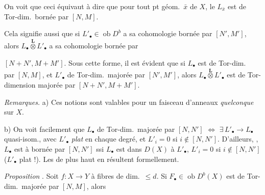 \documentclass[11pt,a4paper]{article}
\begin{document}
On voit que ceci équivaut à dire que pour tout pt géom.\ $\bar{x}$ de $X$,
le  $L_{\bar{x}}$ est de Tor-dim.\ bornée par
$[N, M]$.

\struck{\ill{}}

Cela signifie aussi que si $L'_\bullet \in \operatorname{ob} D^b$ a sa
\struck{\ill{}} cohomologie bornée par $[N', M']$, alors
$L_\bullet \overset{\mathbf{L}}{\otimes} L'_\bullet$ a sa cohomologie bornée
par

\struck{\ill{}} $[N + N', M + M']$. Sous cette forme, il est évident que si
$L_\bullet$ est de Tor-dim.\  par $[N, M]$, et
$L'_\bullet$ de Tor-dim.\ majorée par $[N', M']$, alors
$L_\bullet \overset{\mathbf{L}}{\otimes} L'_\bullet$ est de Tor-dimension
majorée par $[N + N', M + M']$.

\textit{Remarques.} a) Ces notions sont valables pour un faisceau
d'anneaux \textit{quelconque} sur $X$.

b) On voit facilement que $L_\bullet$ de Tor-dim.\ majorée par $[N, N']$
$\Longleftrightarrow$ \struck{\ill{}} $\exists\, L'_\bullet \to L_\bullet$
quasi-isom., avec $L'_\bullet$ \textit{plat} en chaque degré, et
$L'_i = 0$ si $i \notin [N, N']$. D'ailleurs, \ill{}, 
$L_\bullet$ est à  bornée par $[N, N']$ ssi
$L_\bullet$ est \struck{\ill{}}  dans $D(X)$ à
$L'_\bullet$, \struck{\ill{}}  $L'_i = 0$ si
$i \notin [N, N']$ ($L'_\bullet$  plat !). Les
 de  plus haut en résultent
formellement.

\textit{Proposition} . Soit $f \colon X \to Y$  à fibres de
dim.\ $\leq d$. Si $F_\bullet \in \operatorname{ob} D^b(X)$ est de
Tor-dim.\ majorée par $[N, M]$, alors
\end{document}
